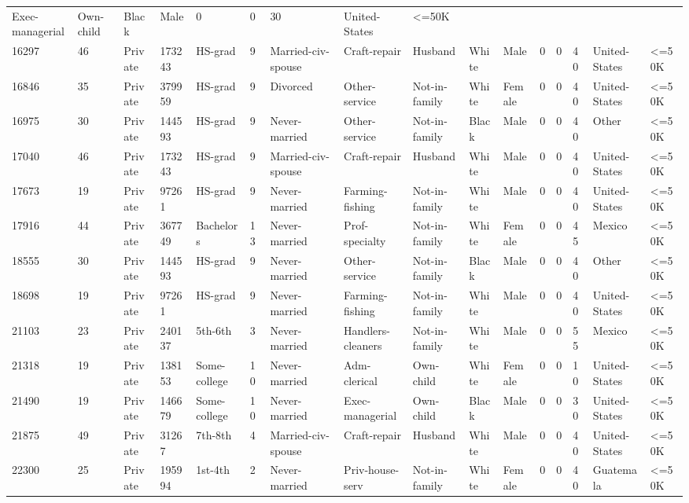 \documentclass[
  letterpaper,
  DIV=11,
  numbers=noendperiod]{scrartcl}
\begin{document}
\begin{longtable}[]{@{}llllllllllllllll@{}}
Exec-managerial & Own-child & Black & Male & 0 & 0 & 30 & United-States
& \textless=50K \\
16297 & 46 & Private & 173243 & HS-grad & 9 & Married-civ-spouse &
Craft-repair & Husband & White & Male & 0 & 0 & 40 & United-States &
\textless=50K \\
16846 & 35 & Private & 379959 & HS-grad & 9 & Divorced & Other-service &
Not-in-family & White & Female & 0 & 0 & 40 & United-States &
\textless=50K \\
16975 & 30 & Private & 144593 & HS-grad & 9 & Never-married &
Other-service & Not-in-family & Black & Male & 0 & 0 & 40 & Other &
\textless=50K \\
17040 & 46 & Private & 173243 & HS-grad & 9 & Married-civ-spouse &
Craft-repair & Husband & White & Male & 0 & 0 & 40 & United-States &
\textless=50K \\
17673 & 19 & Private & 97261 & HS-grad & 9 & Never-married &
Farming-fishing & Not-in-family & White & Male & 0 & 0 & 40 &
United-States & \textless=50K \\
17916 & 44 & Private & 367749 & Bachelors & 13 & Never-married &
Prof-specialty & Not-in-family & White & Female & 0 & 0 & 45 & Mexico &
\textless=50K \\
18555 & 30 & Private & 144593 & HS-grad & 9 & Never-married &
Other-service & Not-in-family & Black & Male & 0 & 0 & 40 & Other &
\textless=50K \\
18698 & 19 & Private & 97261 & HS-grad & 9 & Never-married &
Farming-fishing & Not-in-family & White & Male & 0 & 0 & 40 &
United-States & \textless=50K \\
21103 & 23 & Private & 240137 & 5th-6th & 3 & Never-married &
Handlers-cleaners & Not-in-family & White & Male & 0 & 0 & 55 & Mexico &
\textless=50K \\
21318 & 19 & Private & 138153 & Some-college & 10 & Never-married &
Adm-clerical & Own-child & White & Female & 0 & 0 & 10 & United-States &
\textless=50K \\
21490 & 19 & Private & 146679 & Some-college & 10 & Never-married &
Exec-managerial & Own-child & Black & Male & 0 & 0 & 30 & United-States
& \textless=50K \\
21875 & 49 & Private & 31267 & 7th-8th & 4 & Married-civ-spouse &
Craft-repair & Husband & White & Male & 0 & 0 & 40 & United-States &
\textless=50K \\
22300 & 25 & Private & 195994 & 1st-4th & 2 & Never-married &
Priv-house-serv & Not-in-family & White & Female & 0 & 0 & 40 &
Guatemala & \textless=50K \\

\end{longtable}
\end{document}
